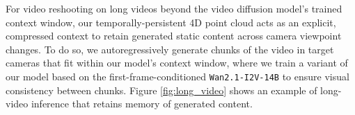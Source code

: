 For video reshooting on long videos beyond the video diffusion model's trained context window, our temporally-persistent 4D point cloud acts as an explicit, compressed context to retain generated static content across camera viewpoint changes. To do so, we autoregressively generate chunks of the video in target cameras that fit within our model's context window, where we train a variant of our model based on the first-frame-conditioned \texttt{Wan2.1-I2V-14B} to ensure visual consistency between chunks. Figure \ref{fig:long_video} shows an example of long-video inference that retains memory of generated content.
